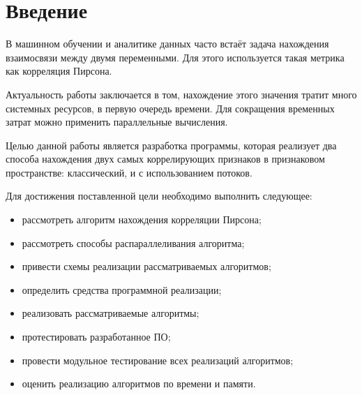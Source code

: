 \newpage
{}

\chapter*{Введение}
В машинном обучении и аналитике данных часто встаёт задача нахождения взаимосвязи между двумя переменными.\cite{ml}
Для этого используется такая метрика как корреляция Пирсона.

Актуальность работы заключается в том, нахождение этого значения тратит много системных ресурсов, в первую очередь времени.
Для сокращения временных затрат можно применить параллельные вычисления.

Целью данной работы является разработка программы, которая реализует два способа нахождения двух самых коррелирующих
признаков в признаковом пространстве: классический, и с использованием потоков.

Для достижения поставленной цели необходимо выполнить следующее:
\begin{itemize}
	\item рассмотреть алгоритм нахождения корреляции Пирсона;
	\item рассмотреть способы распараллеливания алгоритма;
	\item привести схемы реализации рассматриваемых алгоритмов;
	\item определить средства программной реализации;
	\item реализовать рассматриваемые алгоритмы;
	\item протестировать разработанное ПО;
	\item провести модульное тестирование всех реализаций алгоритмов;
	\item оценить реализацию алгоритмов по времени и памяти.
\end{itemize}